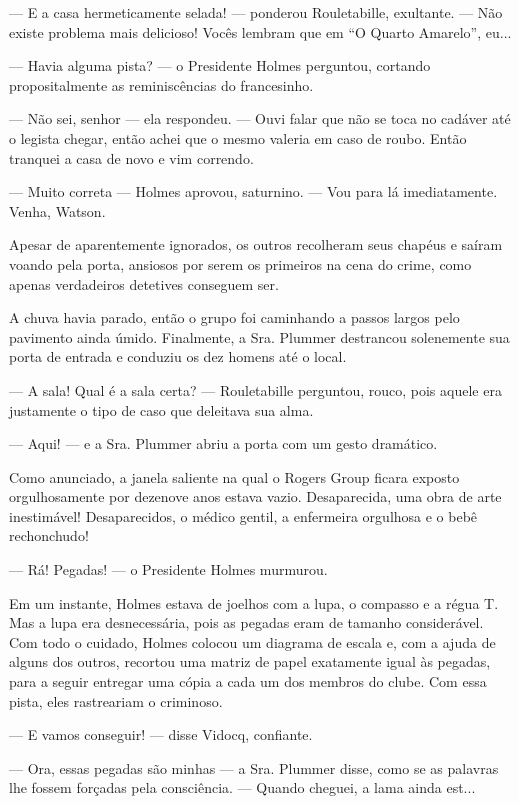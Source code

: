 --- E a casa hermeticamente selada! --- ponderou Rouletabille,
exultante. --- Não existe problema mais delicioso! Vocês lembram que em
``O Quarto Amarelo'', eu...

--- Havia alguma pista? --- o Presidente Holmes perguntou, cortando
propositalmente as reminiscências do francesinho.

--- Não sei, senhor --- ela respondeu. --- Ouvi falar que não se toca no
cadáver até o legista chegar, então achei que o mesmo valeria em caso de
roubo. Então tranquei a casa de novo e vim correndo.

--- Muito correta --- Holmes aprovou, saturnino. --- Vou para lá
imediatamente. Venha, Watson.

Apesar de aparentemente ignorados, os outros recolheram seus chapéus e
saíram voando pela porta, ansiosos por serem os primeiros na cena do
crime, como apenas verdadeiros detetives conseguem ser.

A chuva havia parado, então o grupo foi caminhando a passos largos pelo
pavimento ainda úmido. Finalmente, a Sra. Plummer destrancou solenemente
sua porta de entrada e conduziu os dez homens até o local.

--- A sala! Qual é a sala certa? --- Rouletabille perguntou, rouco, pois
aquele era justamente o tipo de caso que deleitava sua alma.

--- Aqui! --- e a Sra. Plummer abriu a porta com um gesto dramático.

Como anunciado, a janela saliente na qual o Rogers Group ficara exposto
orgulhosamente por dezenove anos estava vazio. Desaparecida, uma obra de
arte inestimável! Desaparecidos, o médico gentil, a enfermeira orgulhosa
e o bebê rechonchudo!

--- Rá! Pegadas! --- o Presidente Holmes murmurou.

Em um instante, Holmes estava de joelhos com a lupa, o compasso e a
régua T. Mas a lupa era desnecessária, pois as pegadas eram de tamanho
considerável. Com todo o cuidado, Holmes colocou um diagrama de escala
e, com a ajuda de alguns dos outros, recortou uma matriz de papel
exatamente igual às pegadas, para a seguir entregar uma cópia a cada um
dos membros do clube. Com essa pista, eles rastreariam o criminoso.

--- E vamos conseguir! --- disse Vidocq, confiante.

--- Ora, essas pegadas são minhas --- a Sra. Plummer disse, como se as
palavras lhe fossem forçadas pela consciência. --- Quando cheguei, a
lama ainda est...

